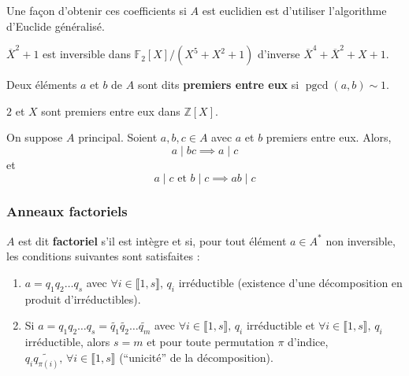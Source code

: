 	\begin{remark}
		Une façon d'obtenir ces coefficients si $A$ est euclidien est d'utiliser l'algorithme d'Euclide généralisé.
	\end{remark}


	\begin{application}
		$\overline{X}^2+1$ est inversible dans $\mathbb{F}_2[X]/(X^5 + X^2 + 1)$ d'inverse $\overline{X}^4+\overline{X}^2+X+1$.
	\end{application}


	\begin{definition}
		Deux éléments $a$ et $b$ de $A$ sont dits \textbf{premiers entre eux} si $\operatorname{pgcd}(a,b) \sim 1$.
	\end{definition}

	\begin{example}
		$2$ et $X$ sont premiers entre eux dans $\mathbb{Z}[X]$.
	\end{example}

	\begin{lemma}[Gauss]
		On suppose $A$ principal. Soient $a, b, c \in A$ avec $a$ et $b$ premiers entre eux. Alors,
		\[ a \mid bc \implies a \mid c \]
		et
		\[ a \mid c \text{ et } b \mid c \implies ab \mid c \]
	\end{lemma}

	\subsubsection{Anneaux factoriels}


	\begin{definition}
		$A$ est dit \textbf{factoriel} s'il est intègre et si, pour tout élément $a \in A^*$ non inversible, les conditions suivantes sont satisfaites :
		\begin{enumerate}[label=(\roman*)]
			\item \label{122-2} $a = q_1 q_2 \dots q_s$ avec $\forall i \in \llbracket 1, s \rrbracket, \, q_i$ irréductible (existence d'une décomposition en produit d'irréductibles).
			\item \label{122-3} Si $a = q_1 q_2 \dots q_s = \widetilde{q_1} \widetilde{q_2} \dots \widetilde{q_m}$ avec $\forall i \in \llbracket 1, s \rrbracket, \, q_i$ irréductible et $\forall i \in \llbracket 1, s \rrbracket, \, q_i$ irréductible, alors $s = m$ et pour toute permutation $\pi$ d'indice, $q_i \widetilde{q_{\pi(i)}}, \, \forall i \in \llbracket 1, s \rrbracket$ (``unicité'' de la décomposition).
		\end{enumerate}
	\end{definition}

